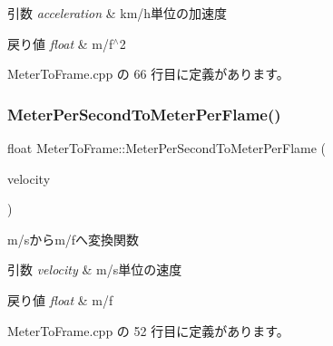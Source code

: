 \begin{DoxyParams}{引数}
{\em acceleration} & km/h単位の加速度 \\
\hline
\end{DoxyParams}

\begin{DoxyRetVals}{戻り値}
{\em float} & m/f$^\wedge$2 \\
\hline
\end{DoxyRetVals}


 Meter\+To\+Frame.\+cpp の 66 行目に定義があります。

\mbox{\label{class_meter_to_frame_aa5468938f59eb934bfc6a897a7513812}} 
\subsubsection{\texorpdfstring{Meter\+Per\+Second\+To\+Meter\+Per\+Flame()}{MeterPerSecondToMeterPerFlame()}}
{\footnotesize\ttfamily float Meter\+To\+Frame\+::\+Meter\+Per\+Second\+To\+Meter\+Per\+Flame (\begin{DoxyParamCaption}\item[{float}]{velocity }\end{DoxyParamCaption})\hspace{0.3cm}{\ttfamily [static]}}



m/sからm/fへ変換関数 


\begin{DoxyParams}{引数}
{\em velocity} & m/s単位の速度 \\
\hline
\end{DoxyParams}

\begin{DoxyRetVals}{戻り値}
{\em float} & m/f \\
\hline
\end{DoxyRetVals}


 Meter\+To\+Frame.\+cpp の 52 行目に定義があります。

\mbox{\label{class_meter_to_frame_af41224ef315c791ade350ffc5829ffc7}} 
